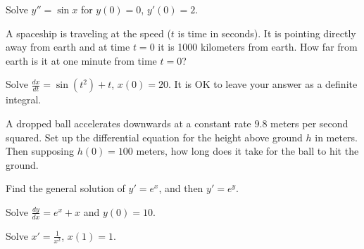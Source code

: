     \begin{exercise}
    Solve $y'' = \sin x$ for $y(0)=0$, $y'(0) = 2$.
    \end{exercise}
    
    \begin{exercise}
    A spaceship is traveling at the speed  ($t$ is
    time in seconds).  It is pointing directly away from earth and at time $t=0$
    it is 1000 kilometers from earth.  How far from earth is it at one minute from
    time $t=0$?
    \end{exercise}
    
    \begin{exercise}
    Solve $\frac{dx}{dt} = \sin(t^2)+t$, $x(0)=20$.  It is OK to leave your
    answer as a definite integral.
    \end{exercise}
    
    \begin{exercise}
    A dropped ball accelerates downwards at a constant rate $9.8$ meters per second
    squared.  Set up the differential equation for the height above ground $h$ in meters.
    Then supposing $h(0) = 100$ meters, how long does it take for the ball to hit
    the ground.
    \end{exercise}
    
    \begin{exercise}
    Find the general solution of
    $y' = e^x$,  and then $y' = e^y$.
    \end{exercise}
    
    
    \setcounter{exercise}{100}
    
    \begin{exercise}
    Solve $\frac{dy}{dx} = e^x + x$ and $y(0) = 10$.
    \end{exercise}
    
    \begin{exercise}
    Solve $x' = \frac{1}{x^2}$, $x(1)=1$.
    \end{exercise}
    
